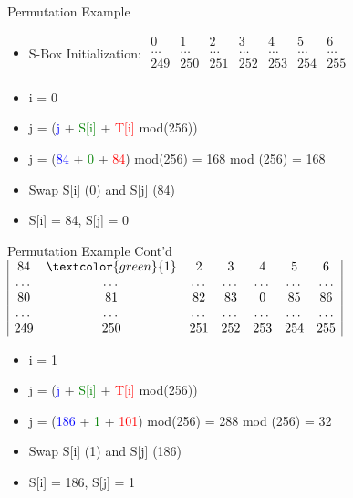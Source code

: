 \documentclass[
	aspectratio=169,	%
	onlytextwidth,		%
	t,					%
	]{beamer}
\begin{document}
\begin{frame}{Permutation Example}
	\begin{itemize}
		\item S-Box Initialization:
		\medskip
		$\begin{array}{|ccccccc|}
		0 & 1 & 2 & 3 & 4 & 5 & 6 \\
		\dots & \dots & \dots & \dots & \dots & \dots & \dots \\
		249 & 250 & 251 & 252 & 253 & 254 & 255 \\
		\end{array}$
		\item i = 0
		\item j = (\textcolor{blue} {j} + \textcolor{green}{S[i]} + \textcolor{red}{T[i]} mod(256))
		\item j = (\textcolor{blue} {84} + \textcolor{green} {0} + \textcolor{red} {84}) mod(256) = 168 mod (256) = 168
		\item Swap S[i] (0) and S[j] (84)
		\item S[i] = 84, S[j] = 0
	\end{itemize}
\end{frame}

\begin{frame}{Permutation Example Cont'd}
	$\begin{array}{|ccccccc|}
		84 & \textcolor{green}{1} & 2 & 3 & 4 & 5 & 6 \\
		\dots & \dots & \dots & \dots & \dots & \dots & \dots \\
		80 & 81 & 82 & 83 & 0 & 85 & 86 \\
		\dots & \dots & \dots & \dots & \dots & \dots & \dots \\
		249 & 250 & 251 & 252 & 253 & 254 & 255 \\
	\end{array}$
	\begin{itemize}
		\item i = 1
		\item j = (\textcolor{blue} {j} + \textcolor{green}{S[i]} + \textcolor{red}{T[i]} mod(256))
		\item j = (\textcolor{blue} {186} + \textcolor{green} {1} + \textcolor{red} {101}) mod(256) = 288 mod (256) = 32
		\item Swap S[i] (1) and S[j] (186)
		\item S[i] = 186, S[j] = 1
	\end{itemize}
\end{frame}
\end{document}
